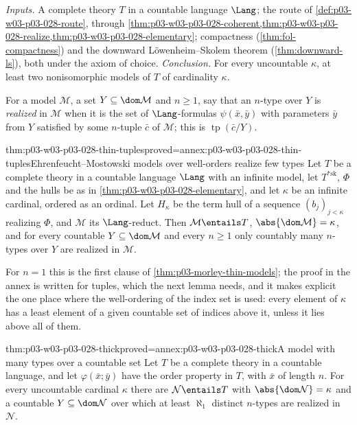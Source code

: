 \emph{Inputs.}  A complete theory \(T\) in a countable language \(\Lang\);
the route of \cref{def:p03-w03-p03-028-route}, through
\cref{thm:p03-w03-p03-028-coherent,thm:p03-w03-p03-028-realize,thm:p03-w03-p03-028-elementary};
compactness (\cref{thm:fol-compactness}) and the downward
L\"owenheim--Skolem theorem (\cref{thm:downward-ls}), both under the axiom
of choice.  \emph{Conclusion.}  For every uncountable \(\kappa\), at least
two nonisomorphic models of \(T\) of cardinality \(\kappa\).

For a model \(\mathcal M\), a set \(Y\subseteq\dom\mathcal M\) and
\(n\geq1\), say that an \(n\)-type over \(Y\) is \emph{realized} in
\(\mathcal M\) when it is the set of \(\Lang\)-formulas
\(\psi(\bar x,\bar y)\) with parameters \(\bar y\) from \(Y\) satisfied by
some \(n\)-tuple \(\bar c\) of \(\mathcal M\); this is
\(\operatorname{tp}(\bar c/Y)\).

\begin{hblemma}{thm:p03-w03-p03-028-thin-tuples}{proved=annex:p03-w03-p03-028-thin-tuples}{Ehrenfeucht--Mostowski models over well-orders realize few types}
Let \(T\) be a complete theory in a countable language \(\Lang\) with an
infinite model, let \(T^{*\mathrm{sk}}\), \(\Phi\) and the hulls be as in
\cref{thm:p03-w03-p03-028-elementary}, and let \(\kappa\) be an infinite
cardinal, ordered as an ordinal.  Let \(H_\kappa\) be the term hull of a
sequence \((b_j)_{j<\kappa}\) realizing \(\Phi\), and \(\mathcal M\) its
\(\Lang\)-reduct.  Then \(\mathcal M\entails T\),
\(\abs{\dom\mathcal M}=\kappa\), and for every countable
\(Y\subseteq\dom\mathcal M\) and every \(n\geq1\) only countably many
\(n\)-types over \(Y\) are realized in \(\mathcal M\).
\end{hblemma}

For \(n=1\) this is the first clause of \cref{thm:p03-morley-thin-models};
the proof in the annex is written for tuples, which the next lemma needs,
and it makes explicit the one place where the well-ordering of the index
set is used: every element of \(\kappa\) has a least element of a given
countable set of indices above it, unless it lies above all of them.

\begin{hblemma}{thm:p03-w03-p03-028-thick}{proved=annex:p03-w03-p03-028-thick}{A model with many types over a countable set}
Let \(T\) be a complete theory in a countable language, and let
\(\varphi(\bar x;\bar y)\) have the order property in \(T\), with
\(\bar x\) of length \(n\).  For every uncountable cardinal \(\kappa\) there
are \(\mathcal N\entails T\) with \(\abs{\dom\mathcal N}=\kappa\) and a
countable \(Y\subseteq\dom\mathcal N\) over which at least \(\aleph_1\)
distinct \(n\)-types are realized in \(\mathcal N\).
\end{hblemma}

